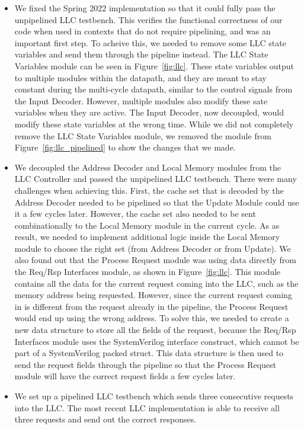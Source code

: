 \documentclass{sig-alternate}
\begin{document}
\begin{itemize}
  \item We fixed the Spring 2022 implementation so that it could fully pass the unpipelined LLC testbench. This verifies the functional correctness of our code when used in contexts that do not require pipelining,
   and was an important first step. To acheive this, we needed to remove some LLC state variables and send them through the pipeline instead. The LLC State Variables module can be seen in Figure~\ref{fig:llc}. These
   state variables output to multiple modules within the datapath, and they are meant to stay constant during the multi-cycle datapath, similar to the control signals from the Input Decoder. However, multiple modules
   also modify these sate variables when they are active. The Input Decoder, now decoupled, would modify these state variables at the wrong time. While we did not completely remove the LLC State Variables module,
   we removed the module from Figure~\ref{fig:llc_pipelined} to show the changes that we made. 
  \item We decoupled the Address Decoder and Local Memory modules from the LLC Controller and passed the unpipelined LLC testbench. There were many challenges when achieving this. First, the cache set that is decoded
   by the Address Decoder needed to be pipelined so that the Update Module could use it a few cycles later. However, the cache set also needed to be sent combinationally to the Local Memory module in the current cycle.
   As as result, we needed to implement additional logic inside the Local Memory module to choose the right set (from Address Decoder or from Update). We also found out that the Process Request module was using data
   directly from the Req/Rsp Interfaces module, as shown in Figure~\ref{fig:llc}. This module contains all the data for the current request coming into the LLC, such as the memory address being requested. However, since
   the current request coming in is different from the request already in the pipeline, the Process Request would end up using the wrong address. To solve this, we needed to create a new data structure to store all
   the fields of the request, because the Req/Rsp Interfaces module uses the SystemVerilog interface construct, which cannot be part of a SystemVerilog packed struct. This data structure is then used to send the request fields
   through the pipeline so that the Process Request module will have the correct request fields a few cycles later.
  \item We set up a pipelined LLC testbench which sends three consecutive requests into the LLC. The most recent LLC implementation is able to receive all three requests and send out the correct responses.
\end{itemize}
\end{document}
